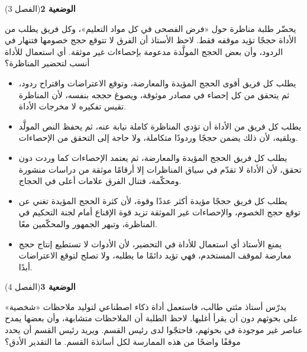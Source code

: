 \documentclass[11pt,a4paper]{article}
\begin{document}
\par\vspace{6pt}
\noindent
{\large\khatt\textbf{الوضعية 2}}\hfill{\small(الفصل 3)}\par\nopagebreak\vspace{3pt}
\setlength{\fboxsep}{7pt}\colorbox{gray!10}{\parbox{\dimexpr\linewidth-14pt}{يحضّر طلبة مناظرة حول «فرض الفصحى في كل مواد التعليم»، وكل فريق يطلب من الأداة حججًا تؤيد موقفه فقط. لاحظ الأستاذ أن الفرق لا تتوقع حجج خصومها فتنهار في الردود، وأن بعض الحجج المولَّدة مدعومة بإحصاءات غير موثقة. أي استعمال للأداة أنسب لتحضير المناظرة؟}}\par\nopagebreak
\begin{itemize}[leftmargin=1.0cm, labelsep=6pt, itemsep=3pt, topsep=4pt, parsep=0pt]
  \item[\textbf{أ)}] يطلب كل فريق أقوى الحجج المؤيدة والمعارضة، وتوقع الاعتراضات واقتراح ردود، ثم يتحقق من كل إحصاء في مصادر موثوقة، ويصوغ حججه بنفسه، لأن المناظرة تقيس تفكيره لا مخرجات الأداة.
  \item[\textbf{ب)}] يطلب كل فريق من الأداة أن تؤدي المناظرة كاملة نيابة عنه، ثم يحفظ النص المولَّد ويلقيه، لأن ذلك يضمن حججًا وردودًا متكاملة، ولا حاجة إلى التحقق من الإحصاءات.
  \item[\textbf{ج)}] يطلب كل فريق الحجج المؤيدة والمعارضة، ثم يعتمد الإحصاءات كما وردت دون تحقق، لأن الأداة لا تقدّم في سياق المناظرات إلا أرقامًا موثقة من دراسات منشورة ومحكّمة، فتنال الفرق علامات أعلى في الحجاج.
  \item[\textbf{د)}] يطلب كل فريق حججًا مؤيدة أكثر عددًا وقوة، لأن كثرة الحجج المؤيدة تغني عن توقع حجج الخصوم، والإحصاءات غير الموثقة تزيد قوة الإقناع أمام لجنة التحكيم في المناظرة، وتبهر الجمهور والمحكّمين معًا.
  \item[\textbf{هـ)}] يمنع الأستاذ أي استعمال للأداة في التحضير، لأن الأدوات لا تستطيع إنتاج حجج معارضة لموقف المستخدم، فهي تؤيد دائمًا ما يطلبه، ولا تصلح لتوقع الاعتراضات أبدًا.
\end{itemize}
\par\vspace{6pt}
\noindent
{\large\khatt\textbf{الوضعية 3}}\hfill{\small(الفصل 4)}\par\nopagebreak\vspace{3pt}
\setlength{\fboxsep}{7pt}\colorbox{gray!10}{\parbox{\dimexpr\linewidth-14pt}{يدرّس أستاذ مئتي طالب، فاستعمل أداة ذكاء اصطناعي لتوليد ملاحظات «شخصية» على بحوثهم دون أن يقرأ أغلبها. لاحظ الطلبة أن الملاحظات متشابهة، وأن بعضها يمدح عناصر غير موجودة في بحوثهم، فاحتجّوا لدى رئيس القسم. ويريد رئيس القسم أن يحدد موقفًا واضحًا من هذه الممارسة لكل أساتذة القسم. ما التقدير الأدق؟}}\par\nopagebreak
\end{document}
